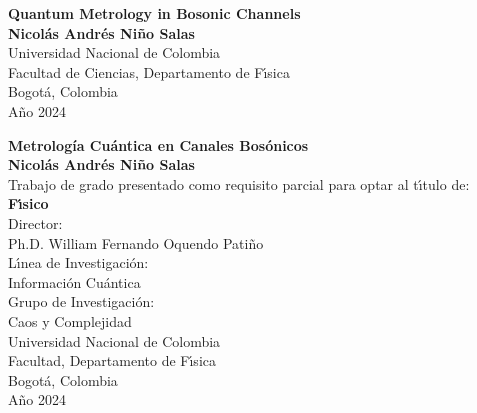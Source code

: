 \begin{center}
\begin{figure}
\centering%
%
\end{figure}
\thispagestyle{empty} \vspace*{2.0cm} \textbf{\huge
Quantum Metrology in Bosonic Channels}\\[6.0cm]
\Large\textbf{Nicol\'{a}s Andr\'{e}s Ni\~{n}o Salas}\\[6.0cm]
\small Universidad Nacional de Colombia\\
Facultad de Ciencias, Departamento de F\'{\i}sica\\
Bogot\'{a}, Colombia\\
A\~{n}o 2024\\
\end{center}

\newpage{\pagestyle{empty}\cleardoublepage}

\newpage
\begin{center}
\thispagestyle{empty} \vspace*{0cm} \textbf{\huge
Metrolog\'{i}a Cu\'{a}ntica en Canales Bos\'{o}nicos}\\[3.0cm]
\Large\textbf{Nicol\'{a}s Andr\'{e}s Ni\~{n}o Salas}\\[3.0cm]
\small Trabajo de grado presentado como requisito parcial para optar al
t\'{\i}tulo de:\\
\textbf{F\'{\i}sico}\\[2.5cm]
Director:\\
Ph.D. William Fernando Oquendo Pati\~{n}o\\[2.0cm]
L\'{\i}nea de Investigaci\'{o}n:\\
Informaci\'{o}n  Cu\'{a}ntica\\
Grupo de Investigaci\'{o}n:\\
Caos y Complejidad\\[2.5cm]
Universidad Nacional de Colombia\\
Facultad, Departamento de F\'{\i}sica\\
Bogot\'{a}, Colombia\\
A\~{n}o 2024\\
\end{center}

\newpage{\pagestyle{empty}\cleardoublepage}

\newpage
\thispagestyle{empty} \textbf{}\normalsize

